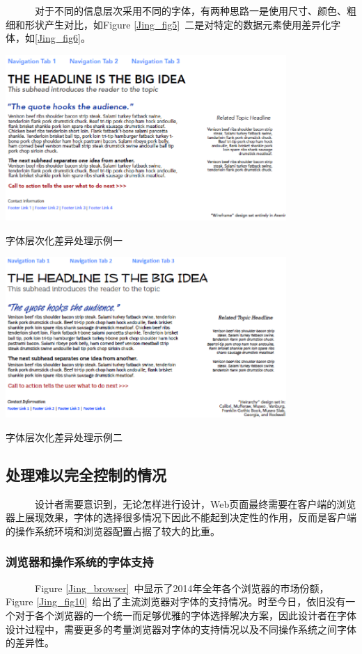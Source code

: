 \documentclass[a4paper]{article}
\begin{document}
~~~~~~对于不同的信息层次采用不同的字体，有两种思路一是使用尺寸、颜色、粗细和形状产生对比，如Figure \ref{Jing_fig5}~二是对特定的数据元素使用差异化字体，如\ref{Jing_fig6}。

\makeatletter
\def\@captype{figure}
\makeatother
\includegraphics [width=0.8\textwidth]{Jing_fig5.png} 
\caption{字体层次化差异处理示例一}
\label{Jing_fig5}

\makeatletter
\def\@captype{figure}
\makeatother
\includegraphics [width=0.8\textwidth]{Jing_fig6.png} 
\caption{字体层次化差异处理示例二}
\label{Jing_fig6}

\subsection{处理难以完全控制的情况}

~~~~~~设计者需要意识到，无论怎样进行设计，Web页面最终需要在客户端的浏览器上展现效果，字体的选择很多情况下因此不能起到决定性的作用，反而是客户端的操作系统环境和浏览器配置占据了较大的比重。

\subsubsection{浏览器和操作系统的字体支持}
	
	~~~~~~Figure \ref{Jing_browser}~中显示了2014年全年各个浏览器的市场份额，Figure \ref{Jing_fig10}~给出了主流浏览器对字体的支持情况。时至今日，依旧没有一个对于各个浏览器的一个统一而足够优雅的字体选择解决方案，因此设计者在字体设计过程中，需要更多的考量浏览器对字体的支持情况以及不同操作系统之间字体的差异性。
\end{document}

